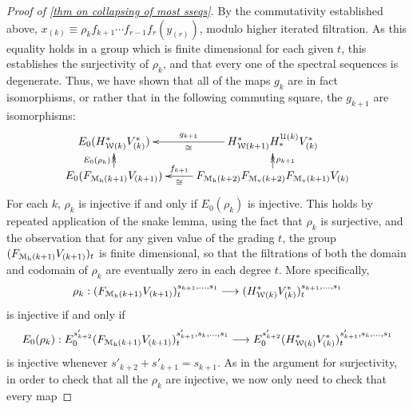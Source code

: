 \documentclass[11pt]{amsart}
\theoremstyle{plain}
\theoremstyle{definition}
\renewcommand{\to}{\longrightarrow}
\newcommand{\calU}{\mathcal{U}}
\newcommand{\calM}{\mathcal{M}}
\newcommand{\calw}{\mathcal{W}}
\newcommand{\calMv}{\mathcal{M}_\textup{v}}
\theoremstyle{plain}
\newcommand{\UEAX}{\overline{X}'}%
\begin{document}
\begin{Calculations of HWn for n nonzero}
\begin{proof}[Proof of \ref{thm on collapsing of most sseqs}]
By the commutativity established above, $x_{(k)}\equiv\rho_{k}f_{k+1}\cdots f_{r-1}f_r(y_{(r)})$, modulo higher iterated filtration. As this equality holds in a group which is finite dimensional for each given $t$, this establishes the surjectivity of $\rho_k$, and that
%
%
%
every one of the spectral sequences is degenerate. Thus, we have shown that all of the maps $g_k$ are in fact isomorphisms, or rather that in the following commuting square, the $g_{k+1}$ are isomorphisms:
\[\xymatrix@R=4mm{
E_{0}(H^*_{\calw(k)}V^*_{(k)})
&H^*_{\calw(k+1)}H_*^{\calU(k)}V^*_{(k)}\ar@{->}[l]^-{\cong}_-{{g}_{k+1}}
\\
E_0(F_{\calM_{\textup{h}}(k+1)}V_{(k+1)})\ar@{->>}[u]^-{E_0(\rho_k)}
&F_{\calM_{\textup{h}}(k+2)}F_{\calM_{\textup{v}}(k+2)}F_{\calMv(k+1)}V_{(k)}\ar@{->}[l]^-{\cong}_-{{f}_{k+1}}\ar@{->>}[u]_-{\rho_{k+1}}
}\]
For each $k$, $\rho_k$ is injective if and only if $E_0(\rho_k)$ is injective. This holds by repeated application of the snake lemma, using the fact that $\rho_k$ is surjective, and the observation that for any given value of the grading $t$, the group $(F_{\calM_{\textup{h}}(k+1)}V_{(k+1)})_t$ is finite dimensional, so that the filtrations of both the domain and codomain of $\rho_k$ are eventually zero in each degree $t$. More specifically,
\[\rho_k:(F_{\calM_{\textup{h}}(k+1)}V_{(k+1)})_t^{s_{k+1},\ldots,s_1}\to (H^*_{\calw(k)}V^*_{(k)})_t^{s_{k+1},\ldots,s_1}\]
is injective if and only if
\[E_0(\rho_k):E_0^{s'_{k+2}}(F_{\calM_{\textup{h}}(k+1)}V_{(k+1)})_t^{s'_{k+1},s_k,\ldots,s_1}\to E_0^{s'_{k+2}}(H^*_{\calw(k)}V^*_{(k)})_t^{s'_{k+1},s_k,\ldots,s_1}\]
is injective whenever $s'_{k+2}+s'_{k+1}=s_{k+1}$. As in the argument for surjectivity, in order to check that all the $\rho_k$ are injective, we now only need to check that every map

\end{proof}
\end{Calculations of HWn for n nonzero}
\end{document}
